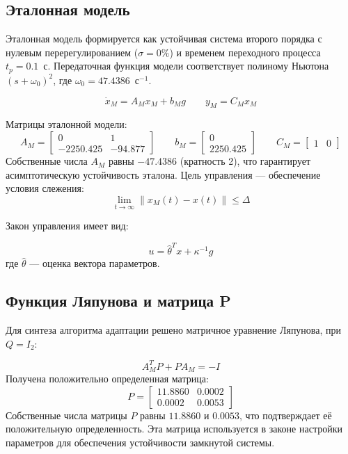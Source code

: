\documentclass[a4paper,12pt]{article}
\begin{document}
	\subsection{Эталонная модель}
	Эталонная модель формируется как устойчивая система второго порядка с нулевым перерегулированием ($\sigma = 0\%$) и временем переходного процесса $t_p = 0{.}1$~с. Передаточная функция модели соответствует полиному Ньютона $(s+\omega_0)^2$, где $\omega_0 = 47{.}4386$~с$^{-1}$.
	
	\begin{equation}
		\dot{x}_M = A_M x_M + b_M g \qquad y_M = C_M x_M
		\label{eq:oM}
	\end{equation}
	
	Матрицы эталонной модели:
	\begin{equation}
		A_M = \begin{bmatrix} 0 & 1 \\ -2250.425 & -94.877 \end{bmatrix} \qquad 
		b_M = \begin{bmatrix} 0 \\ 2250.425 \end{bmatrix} \qquad 
		C_M = \begin{bmatrix} 1 & 0 \end{bmatrix}
	\end{equation}
	Собственные числа $A_M$ равны $-47.4386$ (кратность 2), что гарантирует асимптотическую устойчивость эталона. Цель управления --- обеспечение условия слежения: 
	\begin{equation}
		\lim_{t\to\infty} \|x_M(t) - x(t)\| \leq \Delta
	\end{equation}
	
	
	Закон управления имеет вид:
	
	\begin{equation}
		u = \hat{\theta}^T x + \kappa^{-1}g
	\end{equation}
	где $\hat{\theta}$ --- оценка вектора параметров. 
	
	\subsection{Функция Ляпунова и матрица P}
	Для синтеза алгоритма адаптации решено матричное уравнение Ляпунова, при $Q=I_2$:
	
	\begin{equation}
		A_M^T P + P A_M = -I
	\end{equation}
	Получена положительно определенная матрица:
	\begin{equation}
		P = \begin{bmatrix} 11.8860 & 0.0002 \\ 0.0002 & 0.0053 \end{bmatrix}
	\end{equation}
	Собственные числа матрицы $P$ равны $11.8860$ и $0.0053$, что подтверждает её положительную определенность. Эта матрица используется в законе настройки параметров для обеспечения устойчивости замкнутой системы.
	
\end{document}
